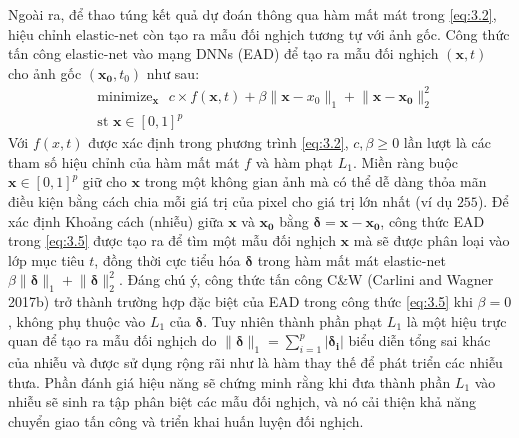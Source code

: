 Ngoài ra, để thao túng kết quả dự đoán thông qua hàm mất mát trong \ref{eq:3.2}, hiệu chỉnh 
elastic-net còn tạo ra mẫu đối nghịch tương tự với ảnh gốc. Công thức tấn công elastic-net
vào mạng DNNs (EAD) để tạo ra mẫu đối nghịch $(\mathbf{x},t)$ cho ảnh gốc $(\mathbf{x_0}, t_0)$ như sau:
\begin{equation}
    \label{eq:3.5}
    \begin{split}
    &\text{minimize}_{\mathbf{x}} \text{ }
    c \times f(\mathbf{x}, t) + \beta \lVert \mathbf{x} - x_0 \rVert_1
    + \lVert \mathbf{x} - \mathbf{x_0} \rVert_2^2 \\
    &\text{st   } \mathbf{x} \in [0,1]^p
    \end{split}
\end{equation}
Với $f(x,t)$ được xác định trong phương trình \ref{eq:3.2}, $c, \beta \geq 0$ lần lượt 
là các tham số  hiệu chỉnh của hàm mất mát $f$ và hàm phạt $L_1$. Miền ràng buộc 
$\mathbf{x} \in [0,1]^p$ giữ cho $\mathbf{x}$ trong một không gian ảnh mà có thể dễ dàng thỏa mãn điều kiện
bằng cách chia mỗi giá trị của pixel cho giá trị lớn nhất (ví dụ $255$). Để xác định Khoảng 
cách (nhiễu) giữa $\mathbf{x}$ và $\mathbf{x_0}$ bằng $\mathbf{\delta} = \mathbf{x} - \mathbf{x_0}$,
công thức EAD trong \ref{eq:3.5} được tạo ra để tìm một mẫu đối nghịch $\mathbf{x}$ mà sẽ 
được phân loại vào lớp mục tiêu $t$, đồng thời cực tiểu hóa $\mathbf{\delta}$ trong hàm
mất mát elastic-net $\beta \lVert \mathbf{\delta} \rVert_1 + \lVert \mathbf{\delta} \rVert_2^2$.
Đáng chú ý, công thức tấn công C\&W (Carlini and Wagner 2017b) trở thành trường hợp đặc biệt 
của EAD trong công thức \ref{eq:3.5} khi $\beta = 0$ , không phụ thuộc vào $L_1$ của $\mathbf{\delta}$.
Tuy nhiên thành phần phạt $L_1$ là một hiệu trực quan để tạo ra mẫu đối nghịch do 
$\lVert \mathbf{\delta} \rVert_1 = \sum_{i=1}^p |\mathbf{\delta_i}|$ biểu diễn tổng sai khác
của nhiễu và được sử dụng rộng rãi như là hàm thay thế để phát triển các nhiễu thưa. 
Phần đánh giá hiệu năng sẽ chứng minh rằng khi đưa thành phần $L_1$ vào nhiễu sẽ sinh ra 
tập phân biệt các mẫu đối nghịch, và nó cải thiện khả năng chuyển giao tấn công và triển 
khai huấn luyện đối nghịch.

